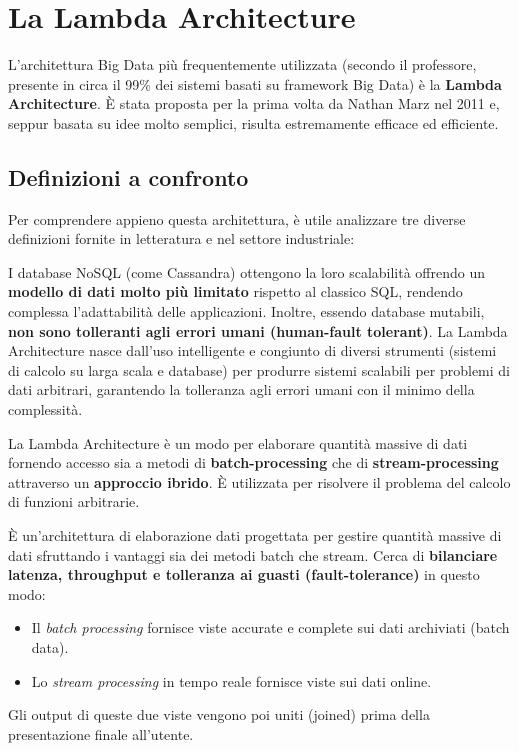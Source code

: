 \section{La Lambda Architecture}

L'architettura Big Data più frequentemente utilizzata (secondo il professore, presente in circa il 99\% dei sistemi basati su framework Big Data) è la \textbf{Lambda Architecture}. È stata proposta per la prima volta da Nathan Marz nel 2011 e, seppur basata su idee molto semplici, risulta estremamente efficace ed efficiente.

\subsection{Definizioni a confronto}
Per comprendere appieno questa architettura, è utile analizzare tre diverse definizioni fornite in letteratura e nel settore industriale:

\begin{definition}
I database NoSQL (come Cassandra) ottengono la loro scalabilità offrendo un \textbf{modello di dati molto più limitato} rispetto al classico SQL, rendendo complessa l'adattabilità delle applicazioni. Inoltre, essendo database mutabili, \textbf{non sono tolleranti agli errori umani (human-fault tolerant)}. 
La Lambda Architecture nasce dall'uso intelligente e congiunto di diversi strumenti (sistemi di calcolo su larga scala e database) per produrre sistemi scalabili per problemi di dati arbitrari, garantendo la tolleranza agli errori umani con il minimo della complessità.
\end{definition}

\begin{definition}
La Lambda Architecture è un modo per elaborare quantità massive di dati fornendo accesso sia a metodi di \textbf{batch-processing} che di \textbf{stream-processing} attraverso un \textbf{approccio ibrido}. È utilizzata per risolvere il problema del calcolo di funzioni arbitrarie.
\end{definition}

\begin{definition}
È un'architettura di elaborazione dati progettata per gestire quantità massive di dati sfruttando i vantaggi sia dei metodi batch che stream. Cerca di \textbf{bilanciare latenza, throughput e tolleranza ai guasti (fault-tolerance)} in questo modo:
\begin{itemize}
    \item Il \textit{batch processing} fornisce viste accurate e complete sui dati archiviati (batch data).
    \item Lo \textit{stream processing} in tempo reale fornisce viste sui dati online.
\end{itemize}
Gli output di queste due viste vengono poi uniti (joined) prima della presentazione finale all'utente.
\end{definition}

